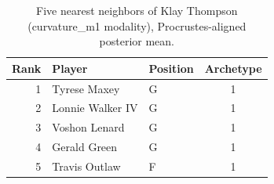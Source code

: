 \begin{table}[htbp]
  \centering\small
  \begin{tabular}{rllc}
    \toprule
    Rank & Player & Position & Archetype \\
    \midrule
    1 & Tyrese Maxey & G & 1 \\
    2 & Lonnie Walker IV & G & 1 \\
    3 & Voshon Lenard & G & 1 \\
    4 & Gerald Green & G & 1 \\
    5 & Travis Outlaw & F & 1 \\
    \bottomrule
  \end{tabular}
  \caption{Five nearest neighbors of Klay Thompson (curvature_m1 modality), Procrustes-aligned posterior mean.}
  \label{tab:Klay_Thompson_neighbors_curvature_m1}
\end{table}

